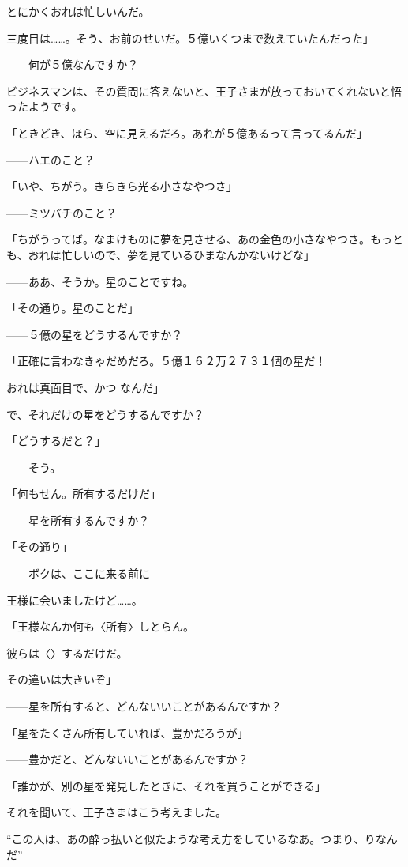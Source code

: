 とにかくおれは忙しいんだ。

三度目は……。そう、お前のせいだ。５億いくつまで数えていたんだった」

——何が５億なんですか？

ビジネスマンは、その質問に答えないと、王子さまが放っておいてくれないと悟ったようです。

「ときどき、ほら、空に見えるだろ。あれが５億あるって言ってるんだ」

——ハエのこと？

「いや、ちがう。きらきら光る小さなやつさ」


——ミツバチのこと？

「ちがうってば。なまけものに夢を見させる、あの金色の小さなやつさ。もっとも、おれは忙しいので、夢を見ているひまなんかないけどな」

——ああ、そうか。星のことですね。

「その通り。星のことだ」

——５億の星をどうするんですか？

「正確に言わなきゃだめだろ。５億１６２万２７３１個の星だ！

おれは真面目で、かつ  なんだ」

で、それだけの星をどうするんですか？


「どうするだと？」

——そう。

「何もせん。所有するだけだ」

——星を所有するんですか？

「その通り」

——ボクは、ここに来る前に

王様に会いましたけど……。

「王様なんか何も〈所有〉しとらん。

彼らは〈〉するだけだ。

その違いは大きいぞ」

——星を所有すると、どんないいことがあるんですか？

「星をたくさん所有していれば、豊かだろうが」

——豊かだと、どんないいことがあるんですか？

「誰かが、別の星を発見したときに、それを買うことができる」

それを聞いて、王子さまはこう考えました。

“この人は、あの酔っ払いと似たような考え方をしているなあ。つまり、りなんだ”


